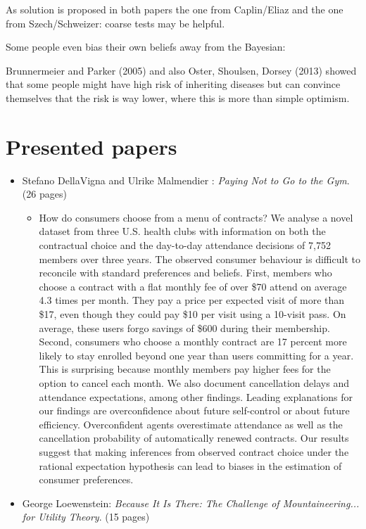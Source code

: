 As solution is proposed in both papers the one from Caplin/Eliaz and the one from Szech/Schweizer: coarse tests may be helpful.
~\newline

Some people even bias their own beliefs away from the Bayesian:
 
Brunnermeier and Parker (2005) and also Oster, Shoulsen, Dorsey (2013) showed that some people might have high risk of inheriting diseases but can convince themselves that the risk is way lower, where this is more than simple optimism.

\section{Presented papers}

\begin{itemize}
	\item Stefano DellaVigna and Ulrike Malmendier : \textit{Paying Not to Go to the Gym}. (26 pages)
		\begin{itemize}
			\item How do consumers choose from a menu of contracts? We analyse a novel dataset from three U.S. health clubs with information on both the contractual choice and the day-to-day attendance decisions of 7,752 members over three years. The observed consumer behaviour is difficult to reconcile with standard preferences and beliefs. First, members who choose a contract with a flat monthly fee of over \$70 attend on average 4.3 times per month. They pay a price per expected visit of more than \$17, even though they could pay \$10 per visit using a 10-visit pass. On average, these users forgo savings of \$600 during their membership. Second, consumers who choose a monthly contract are 17 percent more likely to stay enrolled beyond one year than users committing for a year. This is surprising because monthly members pay higher fees for the option to cancel each month. We also document cancellation delays and attendance expectations, among other findings. Leading explanations for our findings are overconfidence about future self-control or about future efficiency. Overconfident agents overestimate attendance as well as the cancellation probability of automatically renewed contracts. Our results suggest that making inferences from observed contract choice under the rational expectation hypothesis can lead to biases in the estimation of consumer preferences.
		\end{itemize}
	\item George Loewenstein: \textit{Because It Is There: The Challenge of Mountaineering... for Utility Theory}. (15 pages)

\end{itemize}

